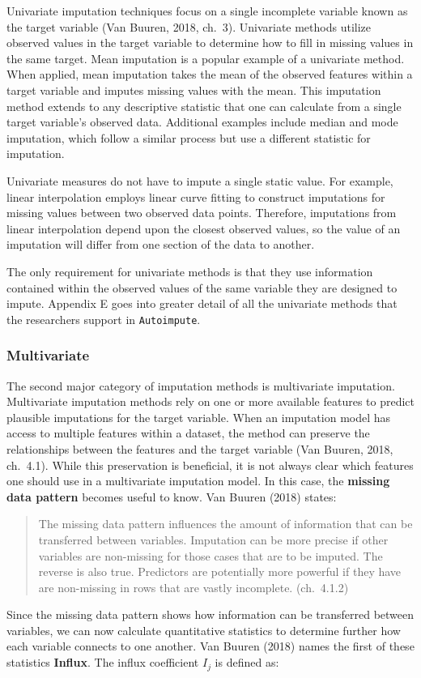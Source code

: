 \documentclass[12pt,oneside]{chicagocapstone}
\begin{document}
Univariate imputation techniques focus on a single incomplete variable
known as the target variable (Van Buuren, 2018, ch.~3). Univariate
methods utilize observed values in the target variable to determine how
to fill in missing values in the same target. Mean imputation is a
popular example of a univariate method. When applied, mean imputation
takes the mean of the observed features within a target variable and
imputes missing values with the mean. This imputation method extends to
any descriptive statistic that one can calculate from a single target
variable's observed data. Additional examples include median and mode
imputation, which follow a similar process but use a different statistic
for imputation.

Univariate measures do not have to impute a single static value. For
example, linear interpolation employs linear curve fitting to construct
imputations for missing values between two observed data points.
Therefore, imputations from linear interpolation depend upon the closest
observed values, so the value of an imputation will differ from one
section of the data to another.

The only requirement for univariate methods is that they use information
contained within the observed values of the same variable they are
designed to impute. Appendix E goes into greater detail of all the
univariate methods that the researchers support in \texttt{Autoimpute}.

\subsubsection*{Multivariate}\label{multivariate}

The second major category of imputation methods is multivariate
imputation. Multivariate imputation methods rely on one or more
available features to predict plausible imputations for the target
variable. When an imputation model has access to multiple features
within a dataset, the method can preserve the relationships between the
features and the target variable (Van Buuren, 2018, ch.~4.1). While this
preservation is beneficial, it is not always clear which features one
should use in a multivariate imputation model. In this case, the
\textbf{missing data pattern} becomes useful to know. Van Buuren (2018)
states:
\begin{quote}
The missing data pattern influences the amount of information that can
be transferred between variables. Imputation can be more precise if
other variables are non-missing for those cases that are to be imputed.
The reverse is also true. Predictors are potentially more powerful if
they have are non-missing in rows that are vastly incomplete.
(ch.~4.1.2)
\end{quote}
Since the missing data pattern shows how information can be transferred
between variables, we can now calculate quantitative statistics to
determine further how each variable connects to one another. Van Buuren
(2018) names the first of these statistics \textbf{Influx}. The influx
coefficient \(I_j\) is defined as:
\end{document}
